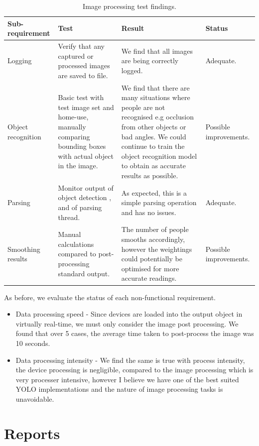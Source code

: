 \documentclass{l4proj}
\begin{document}
\begin{table}
\begin{tabularx}{\textwidth}{|X|X|X|X|}
\hline
\textbf{Sub-requirement} & \textbf{Test} & \textbf{Result} & \textbf{Status}\tabularnewline
\hline
Logging & Verify that any captured or processed images are saved to file. &  We find that all images are being correctly logged. & Adequate. \\
\hline 
Object recognition & Basic test with test image set and home-use, manually comparing bounding boxes with actual object in the image. & We find that there are many situations where people are not recognised e.g occlusion from other objects or bad angles. We could continue to train the object recognition model to obtain as accurate results as possible. & Possible improvements. \\
\hline
Parsing & Monitor output of object detection , and of parsing thread. & As expected, this is a simple parsing operation and has no issues. & Adequate.\\
\hline
Smoothing results  & Manual calculations compared to post-processing standard output. & The number of people smooths accordingly, however the weightings could potentially be optimised for more accurate readings. & Possible improvements.\\
\hline
\end{tabularx}
\caption{Image processing test findings.}
\label{table:imgproc}
\end{table}

As before, we evaluate the status of each non-functional requirement.

\begin{itemize}	
  \item Data processing speed - Since devices are loaded into the output object in virtually real-time, we must only consider the image post processing. We found that over 5 cases, the average time taken to post-process the image was 10 seconds.
  \item Data processing intensity  - We find the same is true with process intensity, the device processing is negligible, compared to the image processing which is very processer intensive, however I believe we have one of the best suited YOLO implementations and the nature of image processing tasks is unavoidable.
\end{itemize}



\section{Reports}
\end{document}
